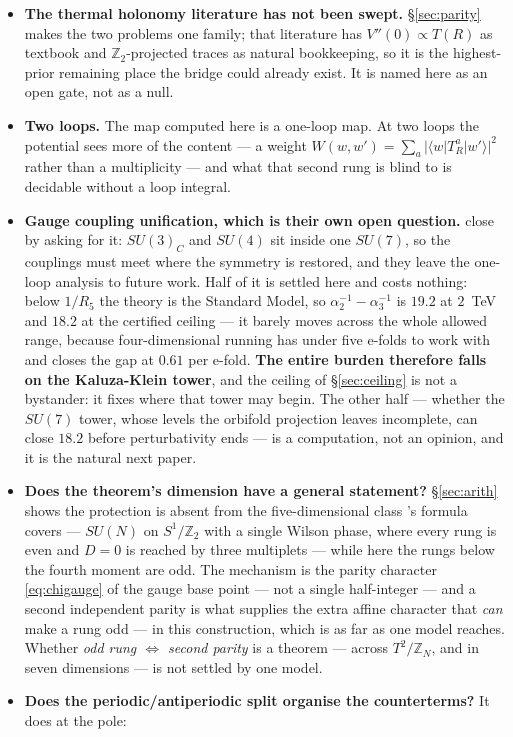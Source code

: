 \documentclass[11pt,a4paper]{article}
\newcommand{\ZZ}{\mathbb{Z}}
\newcommand{\su}[1]{SU(#1)}
\begin{document}
\begin{itemize}
\item \textbf{The thermal holonomy literature has not been swept.} \S\ref{sec:parity} makes the two
problems one family; that literature has $V''(0)\propto T(R)$ as textbook and $\ZZ_2$-projected
traces as natural bookkeeping, so it is the highest-prior remaining place the bridge could already
exist. It is named here as an open gate, not as a null.
\item \textbf{Two loops.} The map computed here is a one-loop map. At two loops the potential sees
more of the content --- a weight $W(w,w')=\sum_a|\langle w|T^a_R|w'\rangle|^2$ rather than a
multiplicity --- and what that second rung is blind to is decidable without a loop integral.
\item \textbf{Gauge coupling unification, which is their own open question.} \cite{KM25} close by
asking for it: $\su3_C$ and $\su4$ sit inside one $\su7$, so the couplings must meet where the
symmetry is restored, and they leave the one-loop analysis to future work. Half of it is settled
here and costs nothing: below $1/R_5$ the theory is the Standard Model, so
$\alpha_2^{-1}-\alpha_3^{-1}$ is $19.2$ at $2$~TeV and $18.2$ at the certified ceiling --- it barely
moves across the whole allowed range, because four-dimensional running has under five e-folds to
work with and closes the gap at $0.61$ per e-fold. \textbf{The entire burden therefore falls on the
Kaluza-Klein tower}, and the ceiling of \S\ref{sec:ceiling} is not a bystander: it fixes where that
tower may begin. The other half --- whether the $\su7$ tower, whose levels the orbifold projection
leaves incomplete, can close $18.2$ before perturbativity ends --- is a computation, not an opinion,
and it is the natural next paper.
\item \textbf{Does the theorem's dimension have a general statement?} \S\ref{sec:arith} shows the
protection is absent from the five-dimensional class \cite{HY04}'s formula covers --- $\su{N}$ on
$S^1/\ZZ_2$ with a single Wilson phase, where every rung is even and $D=0$ is reached by three
multiplets --- while here the rungs below the fourth moment are odd. The mechanism is the parity
character \eqref{eq:chigauge} of the gauge base point --- not a single half-integer --- and a
second independent parity is what supplies the extra affine character that
\emph{can} make a rung odd --- in this construction, which is as far as one model reaches.
Whether
\emph{odd rung $\Leftrightarrow$ second parity} is a theorem --- across $T^2/\ZZ_N$, and in seven
dimensions --- is not settled by one model.
\item \textbf{Does the periodic/antiperiodic split organise the counterterms?} It does at the pole:

\end{itemize}
\end{document}
